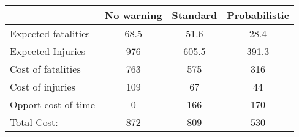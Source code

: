 
\begin{table}[ht]
\centering
\begin{tabular}{lccc}
\hline 
 & \textbf{No warning} & \textbf{Standard} & \textbf{Probabilistic} \\

\hline 
Expected fatalities & 68.5 & 51.6 & 28.4 \\ 
Expected Injuries   & 976 & 605.5 & 391.3  \\ 
Cost of fatalities & 763 & 575 & 316\\
Cost of injuries  & 109 & 67 & 44 \\
Opport cost of time  & 0 & 166 & 170  \\
Total Cost:  & 872 & 809 & 530 \\
\hline
\end{tabular}
\end{table}